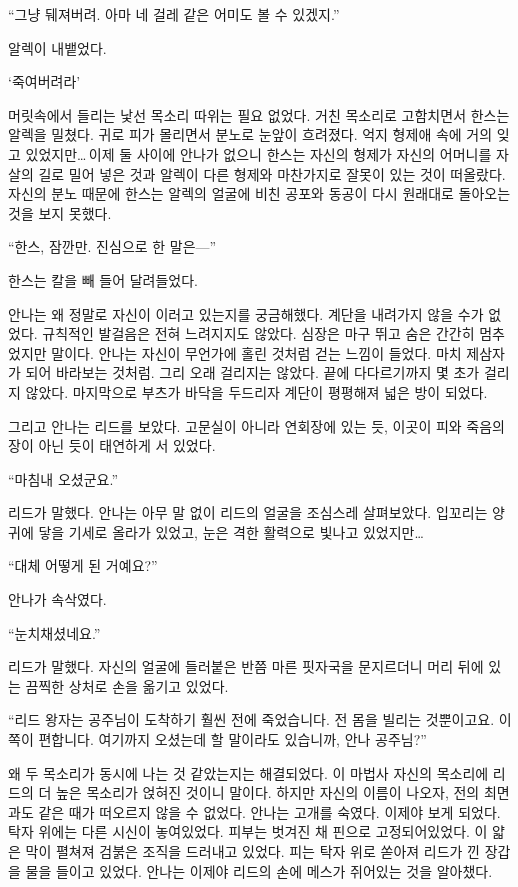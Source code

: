 ``그냥 뒈져버려. 아마 네 걸레 같은 어미도 볼 수 있겠지.''

알렉이 내뱉었다.

`죽여버려라'

머릿속에서 들리는 낯선 목소리 따위는 필요 없었다. 거친 목소리로 고함치면서 한스는 알렉을 밀쳤다. 귀로 피가 몰리면서 분노로 눈앞이 흐려졌다. 억지 형제애 속에 거의 잊고 있었지만\ldots\,이제 둘 사이에 안나가 없으니 한스는 자신의 형제가 자신의 어머니를 자살의 길로 밀어 넣은 것과 알렉이 다른 형제와 마찬가지로 잘못이 있는 것이 떠올랐다. 자신의 분노 때문에 한스는 알렉의 얼굴에 비친 공포와 동공이 다시 원래대로 돌아오는 것을 보지 못했다.

``한스, 잠깐만. 진심으로 한 말은—''

한스는 칼을 빼 들어 달려들었다.

\textbreak

안나는 왜 정말로 자신이 이러고 있는지를 궁금해했다. 계단을 내려가지 않을 수가 없었다. 규칙적인 발걸음은 전혀 느려지지도 않았다. 심장은 마구 뛰고 숨은 간간히 멈추었지만 말이다. 안나는 자신이 무언가에 홀린 것처럼 걷는 느낌이 들었다. 마치 제삼자가 되어 바라보는 것처럼. 그리 오래 걸리지는 않았다. 끝에 다다르기까지 몇 초가 걸리지 않았다. 마지막으로 부츠가 바닥을 두드리자 계단이 평평해져 넓은 방이 되었다.

그리고 안나는 리드를 보았다. 고문실이 아니라 연회장에 있는 듯, 이곳이 피와 죽음의 장이 아닌 듯이 태연하게 서 있었다.

``마침내 오셨군요.''

리드가 말했다. 안나는 아무 말 없이 리드의 얼굴을 조심스레 살펴보았다. 입꼬리는 양 귀에 닿을 기세로 올라가 있었고, 눈은 격한 활력으로 빛나고 있었지만\ldots

``대체 어떻게 된 거예요?''

안나가 속삭였다.

``눈치채셨네요.''

리드가 말했다. 자신의 얼굴에 들러붙은 반쯤 마른 핏자국을 문지르더니 머리 뒤에 있는 끔찍한 상처로 손을 옮기고 있었다.

``리드 왕자는 공주님이 도착하기 훨씬 전에 죽었습니다. 전 몸을 빌리는 것뿐이고요. 이쪽이 편합니다. 여기까지 오셨는데 할 말이라도 있습니까, 안나 공주님?''

왜 두 목소리가 동시에 나는 것 같았는지는 해결되었다. 이 마법사 자신의 목소리에 리드의 더 높은 목소리가 얹혀진 것이니 말이다. 하지만 자신의 이름이 나오자, 전의 최면과도 같은 때가 떠오르지 않을 수 없었다. 안나는 고개를 숙였다. 이제야 보게 되었다. 탁자 위에는 다른 시신이 놓여있었다. 피부는 벗겨진 채 핀으로 고정되어있었다. 이 얇은 막이 펼쳐져 검붉은 조직을 드러내고 있었다. 피는 탁자 위로 쏟아져 리드가 낀 장갑을 물을 들이고 있었다. 안나는 이제야 리드의 손에 메스가 쥐어있는 것을 알아챘다.

